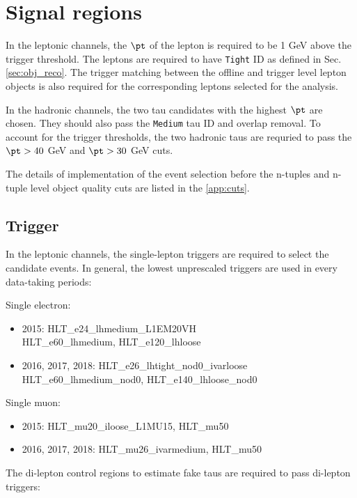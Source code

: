 \section{Signal regions}
\label{sec:selection}

In the leptonic channels, the $\pt$ of the lepton is required to be 1 GeV above the trigger threshold. The leptons are required to have \texttt{Tight} ID as defined in Sec. \ref{sec:obj_reco}. The trigger matching between the offline and trigger level lepton objects is also required for the corresponding leptons selected for the analysis.

In the hadronic channels, the two tau candidates with the highest $\pt$ are chosen. They should also pass the \texttt{Medium} tau ID and overlap removal. To account for the trigger thresholds, the two hadronic taus are requried to pass the $\pt>40$ GeV and $\pt>30$ GeV cuts.

The details of implementation of the event selection before the n-tuples and n-tuple level object quality cuts are listed in the \ref{app:cuts}.

\subsection{Trigger}
\label{sec:trigger}

In the leptonic channels, the single-lepton triggers are required to select the candidate events. In general, the lowest unprescaled triggers are used in every data-taking periods:

Single electron:

\begin{itemize}
\item 2015: HLT\_e24\_lhmedium\_L1EM20VH\\
HLT\_e60\_lhmedium, HLT\_e120\_lhloose
\item 2016, 2017, 2018: HLT\_e26\_lhtight\_nod0\_ivarloose\\
HLT\_e60\_lhmedium\_nod0, HLT\_e140\_lhloose\_nod0
\end{itemize}

Single muon:

\begin{itemize}
\item 2015: HLT\_mu20\_iloose\_L1MU15, HLT\_mu50
\item 2016, 2017, 2018: HLT\_mu26\_ivarmedium, HLT\_mu50
\end{itemize}

The di-lepton control regions to estimate fake taus are required to pass di-lepton triggers:

